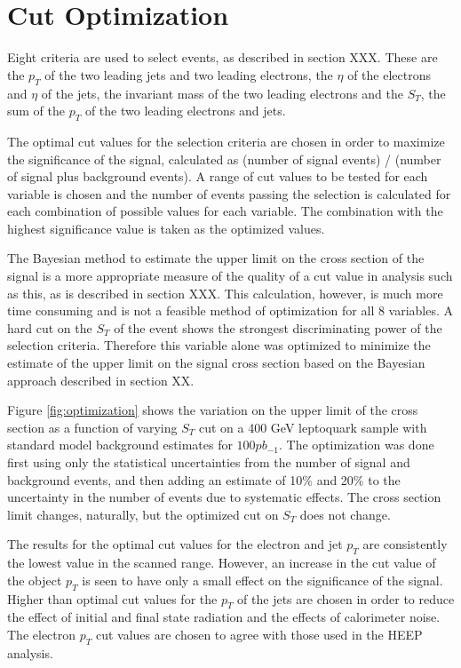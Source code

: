 %
%
\section{Cut Optimization} \label{sec:cutOptimization}

Eight criteria are used to select events, as described in section XXX.  These are the $p_T$ of the two leading jets and two leading electrons, the $\eta$ of the electrons and $\eta$ of the jets, the invariant mass of the two leading electrons and the $S_T$, the sum of the $p_T$ of the two leading electrons and jets.  

The optimal cut values for the selection criteria are chosen in order to maximize the significance of the signal, calculated as (number of signal events) / (number of signal plus background events).
A range of cut values to be tested for each variable is chosen and the number of events passing the selection is calculated for each combination of possible values for each variable.  The combination with the 
highest significance value is taken as the optimized values.

The Bayesian method to estimate the upper limit on the cross section of the signal is a more appropriate measure of the quality of a cut value in analysis such as this, as is described in section XXX.  
This calculation, however, is much more time consuming and is not a feasible method of optimization for all 8 variables.  A hard cut on the $S_T$ of the event shows the strongest discriminating power of the selection criteria.  
Therefore this variable alone was optimized to minimize the estimate of the upper limit on the signal cross section based on the Bayesian approach described in section XX.  

Figure \ref{fig:optimization} shows the variation on the upper limit of the cross section as a function of varying $S_T$ cut on a 400 GeV leptoquark sample with standard model background estimates for $100 pb_{-1}$.  The optimization was done first using only the statistical uncertainties from the number of signal and background events, and then adding an estimate of 10\% and 20\% to the uncertainty in the number of events due to systematic effects.  The cross section limit changes, naturally, but the optimized cut on $S_T$ does not change.  

The results for the optimal cut values for the electron and jet $p_T$ are consistently the lowest value in the scanned range.  However, an increase in the cut value of the object $p_T$ is seen to have only a small effect on the significance of the signal.  Higher than optimal cut values for the $p_T$ of the jets are chosen in order to reduce the effect of initial and final state radiation and the effects of calorimeter noise.  The electron $p_T$ cut values are chosen to agree with those used in the HEEP analysis.

